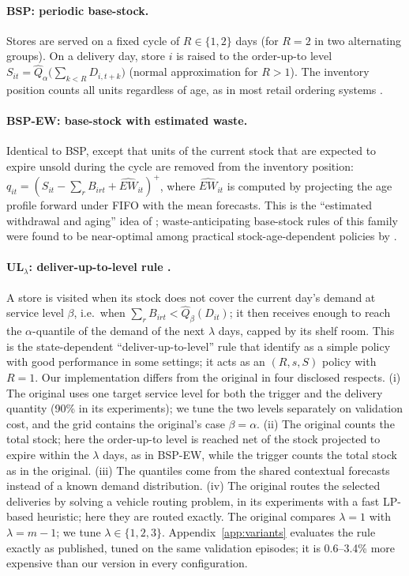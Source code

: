 \paragraph{BSP: periodic base-stock.} Stores are served on a fixed cycle of $R\in\{1,2\}$ days (for $R=2$ in two alternating groups). On a delivery day, store $i$ is raised to the order-up-to level $S_{it}=\hat Q_\alpha\big(\sum_{k<R}D_{i,t+k}\big)$ (normal approximation for $R>1$). The inventory position counts all units regardless of age, as in most retail ordering systems \citep{haijema2019improved}.

\paragraph{BSP-EW: base-stock with estimated waste.} Identical to BSP, except that units of the current stock that are expected to expire unsold during the cycle are removed from the inventory position: $q_{it}=(S_{it}-\sum_r B_{irt}+\widehat{EW}_{it})^{+}$, where $\widehat{EW}_{it}$ is computed by projecting the age profile forward under FIFO with the mean forecasts. This is the ``estimated withdrawal and aging'' idea of \citet{broekmeulen2009heuristic}; waste-anticipating base-stock rules of this family were found to be near-optimal among practical stock-age-dependent policies by \citet{haijema2019improved}.

\paragraph{UL$_\lambda$: deliver-up-to-level rule \citep{crama2018stochastic}.} A store is visited when its stock does not cover the current day's demand at service level $\beta$, i.e.\ when $\sum_r B_{irt}<\hat Q_\beta(D_{it})$; it then receives enough to reach the $\alpha$-quantile of the demand of the next $\lambda$ days, capped by its shelf room. This is the state-dependent ``deliver-up-to-level'' rule that \citet{crama2018stochastic} identify as a simple policy with good performance in some settings; it acts as an $(R,s,S)$ policy with $R=1$. Our implementation differs from the original in four disclosed respects. (i) The original uses one target service level for both the trigger and the delivery quantity (90\% in its experiments); we tune the two levels separately on validation cost, and the grid contains the original's case $\beta=\alpha$. (ii) The original counts the total stock; here the order-up-to level is reached net of the stock projected to expire within the $\lambda$ days, as in BSP-EW, while the trigger counts the total stock as in the original. (iii) The quantiles come from the shared contextual forecasts instead of a known demand distribution. (iv) The original routes the selected deliveries by solving a vehicle routing problem, in its experiments with a fast LP-based heuristic; here they are routed exactly. The original compares $\lambda=1$ with $\lambda=m-1$; we tune $\lambda\in\{1,2,3\}$. Appendix~\ref{app:variants} evaluates the rule exactly as published, tuned on the same validation episodes; it is 0.6--3.4\% more expensive than our version in every configuration.

